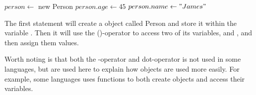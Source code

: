 \begin{algorithm}[H]
	\begin{algorithmic}[1]
		\State $person \gets$ new Person
		\State $person.age \gets 45$
		\State $person.name \gets "James"$
	\end{algorithmic}
\end{algorithm}

The first statement will create a  object called Person and store it within the variable . Then it will use the ()-operator to access two of its variables,  and , and then assign them values.

Worth noting is that both the -operator and dot-operator is not used in some languages, but are used here to explain how objects are used more easily. For example, some languages uses functions to both create objects and access their variables.

